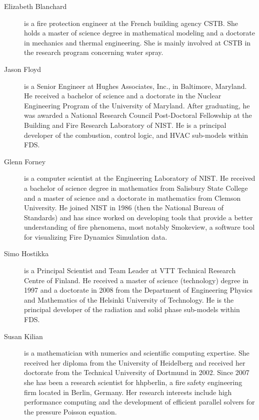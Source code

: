 \begin{description}

\item[Elizabeth Blanchard] is a fire protection engineer at the French building agency CSTB. She holds a master of science degree in mathematical modeling and a doctorate in mechanics and thermal engineering. She is mainly involved at CSTB in the research program concerning water spray.

\item[Jason Floyd] is a Senior Engineer at Hughes Associates, Inc., in Baltimore, Maryland. He received a bachelor of science and a doctorate in the Nuclear Engineering Program of the University of Maryland. After graduating, he was awarded a National Research Council Post-Doctoral Fellowship at the Building and Fire Research Laboratory of NIST. He is a principal developer of the combustion, control logic, and HVAC sub-models within FDS.

\item[Glenn Forney] is a computer scientist at the Engineering Laboratory of NIST.  He received a bachelor of science degree in mathematics from Salisbury State College and a master of science and a doctorate in mathematics from Clemson University.  He joined NIST in 1986 (then the National Bureau of Standards) and has since worked on developing tools that provide a better understanding of fire phenomena, most notably Smokeview, a software tool for visualizing Fire Dynamics Simulation data.

\item[Simo Hostikka] is a Principal Scientist and Team Leader at VTT Technical Research Centre of Finland. He received a master of science (technology) degree in 1997 and a doctorate in 2008 from the Department of Engineering Physics and Mathematics of the Helsinki University of Technology.  He is the principal developer of the radiation and solid phase sub-models within FDS.

\item[Susan Kilian] is a mathematician with numerics and scientific computing expertise. She received her diploma from the University of Heidelberg and received her doctorate from the Technical University of Dortmund in 2002. Since 2007 she has been a research scientist for hhpberlin, a fire safety engineering firm located in Berlin, Germany. Her research interests include high performance computing and the development of efficient parallel solvers for the pressure Poisson equation. 


\end{description}
